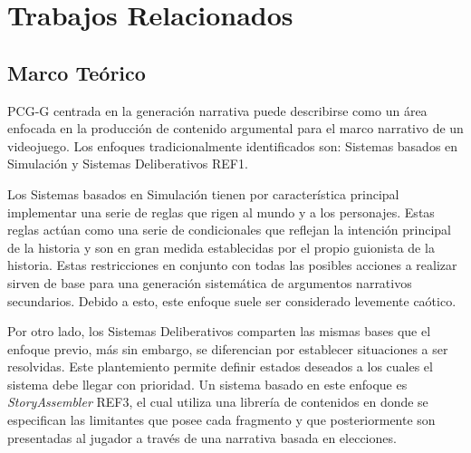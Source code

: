 \chapter{Trabajos Relacionados}



\section{Marco Teórico}

\ac{PCG-G} centrada en la generación narrativa puede describirse como un área enfocada en la producción de contenido argumental para el marco narrativo de un videojuego. Los enfoques tradicionalmente identificados son: Sistemas basados en Simulación y Sistemas Deliberativos REF1.

Los Sistemas basados en Simulación tienen por característica principal implementar una serie de reglas que rigen al mundo y a los personajes. Estas reglas actúan como una serie de condicionales que reflejan la intención principal de la historia y son en gran medida establecidas por el propio guionista de la historia. Estas restricciones en conjunto con todas las posibles acciones a realizar sirven de base para una generación sistemática de argumentos narrativos secundarios. Debido a esto, este enfoque suele ser considerado levemente caótico.

Por otro lado, los Sistemas Deliberativos comparten las mismas bases que el enfoque previo, más sin embargo, se diferencian por establecer situaciones a ser resolvidas. Este plantemiento permite definir estados deseados a los cuales el sistema debe llegar con prioridad. Un sistema basado en este enfoque es \textit{StoryAssembler} REF3, el cual utiliza una librería de contenidos en donde se especifican las limitantes que posee cada fragmento y que posteriormente son presentadas al jugador a través de una narrativa basada en elecciones. 

